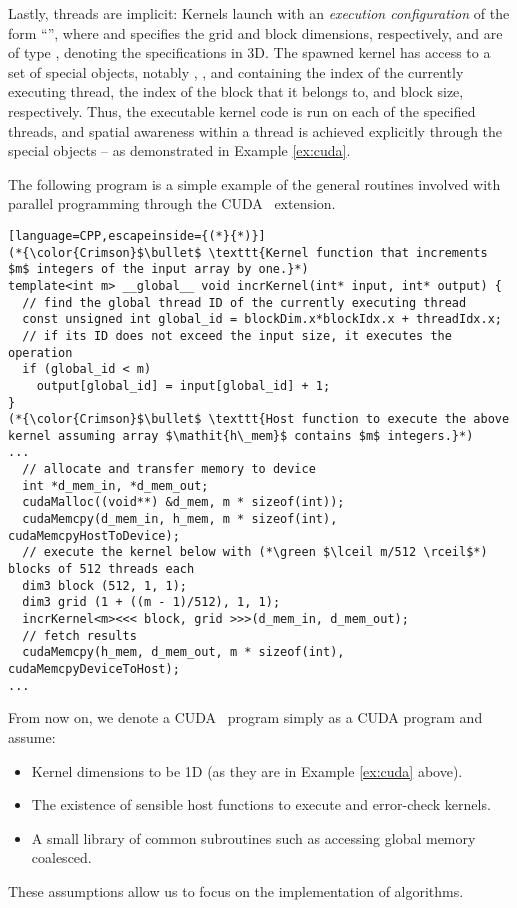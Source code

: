 Lastly, threads are implicit: Kernels launch with an \textit{execution
  configuration} of the form ``'', where
 and  specifies the grid and block dimensions,
respectively, and are of type , denoting the specifications in 3D. The
spawned kernel has access to a set of special objects, notably ,
, and  containing the index of the currently
executing thread, the index of the block that it belongs to, and block size,
respectively. Thus, the executable kernel code is run on each of the specified
threads, and spatial awareness within a thread is achieved explicitly through
the special objects -- as demonstrated in Example \ref{ex:cuda}.

\begin{floatenv}
\begin{example}\label{ex:cuda}
  The following program is a simple example of the general routines
  involved with parallel programming through the CUDA \cpp\ extension.
\begin{lstlisting}[language=CPP,escapeinside={(*}{*)}]
(*{\color{Crimson}$\bullet$ \texttt{Kernel function that increments $m$ integers of the input array by one.}*)
template<int m> __global__ void incrKernel(int* input, int* output) {
  // find the global thread ID of the currently executing thread
  const unsigned int global_id = blockDim.x*blockIdx.x + threadIdx.x;
  // if its ID does not exceed the input size, it executes the operation
  if (global_id < m)
    output[global_id] = input[global_id] + 1;
}
(*{\color{Crimson}$\bullet$ \texttt{Host function to execute the above kernel assuming array $\mathit{h\_mem}$ contains $m$ integers.}*)
...
  // allocate and transfer memory to device
  int *d_mem_in, *d_mem_out;
  cudaMalloc((void**) &d_mem, m * sizeof(int));
  cudaMemcpy(d_mem_in, h_mem, m * sizeof(int), cudaMemcpyHostToDevice);
  // execute the kernel below with (*\green $\lceil m/512 \rceil$*) blocks of 512 threads each
  dim3 block (512, 1, 1);
  dim3 grid (1 + ((m - 1)/512), 1, 1);
  incrKernel<m><<< block, grid >>>(d_mem_in, d_mem_out);
  // fetch results
  cudaMemcpy(h_mem, d_mem_out, m * sizeof(int), cudaMemcpyDeviceToHost);
...
\end{lstlisting}
\end{example}
\end{floatenv}

From now on, we denote a CUDA \cpp\ program simply as a CUDA program and assume:
\begin{itemize}
  \renewcommand\labelitemi{--}
\item Kernel dimensions to be 1D (as they are in Example \ref{ex:cuda} above).
\item The existence of sensible host functions to execute and error-check
  kernels.
\item A small library of common subroutines such as accessing global memory
  coalesced.
\end{itemize}
These assumptions allow us to focus on the implementation of algorithms.

